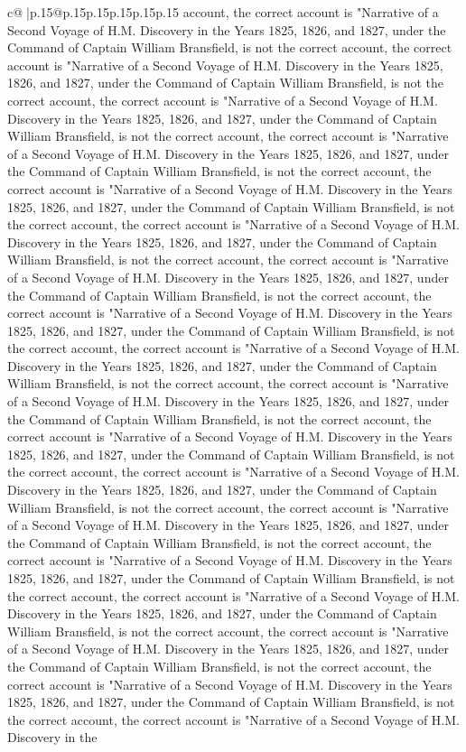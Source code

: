 \documentclass{article}
\begin{document}
{\begin{supertabular}{c@{$\;$}|p{.15\linewidth}@{}p{.15\linewidth}p{.15\linewidth}p{.15\linewidth}p{.15\linewidth}p{.15\linewidth}}
{{{account, the correct account is "Narrative of a Second Voyage of H.M. Discovery in the Years 1825, 1826, and 1827, under the Command of Captain William Bransfield, is not the correct account, the correct account is "Narrative of a Second Voyage of H.M. Discovery in the Years 1825, 1826, and 1827, under the Command of Captain William Bransfield, is not the correct account, the correct account is "Narrative of a Second Voyage of H.M. Discovery in the Years 1825, 1826, and 1827, under the Command of Captain William Bransfield, is not the correct account, the correct account is "Narrative of a Second Voyage of H.M. Discovery in the Years 1825, 1826, and 1827, under the Command of Captain William Bransfield, is not the correct account, the correct account is "Narrative of a Second Voyage of H.M. Discovery in the Years 1825, 1826, and 1827, under the Command of Captain William Bransfield, is not the correct account, the correct account is "Narrative of a Second Voyage of H.M. Discovery in the Years 1825, 1826, and 1827, under the Command of Captain William Bransfield, is not the correct account, the correct account is "Narrative of a Second Voyage of H.M. Discovery in the Years 1825, 1826, and 1827, under the Command of Captain William Bransfield, is not the correct account, the correct account is "Narrative of a Second Voyage of H.M. Discovery in the Years 1825, 1826, and 1827, under the Command of Captain William Bransfield, is not the correct account, the correct account is "Narrative of a Second Voyage of H.M. Discovery in the Years 1825, 1826, and 1827, under the Command of Captain William Bransfield, is not the correct account, the correct account is "Narrative of a Second Voyage of H.M. Discovery in the Years 1825, 1826, and 1827, under the Command of Captain William Bransfield, is not the correct account, the correct account is "Narrative of a Second Voyage of H.M. Discovery in the Years 1825, 1826, and 1827, under the Command of Captain William Bransfield, is not the correct account, the correct account is "Narrative of a Second Voyage of H.M. Discovery in the Years 1825, 1826, and 1827, under the Command of Captain William Bransfield, is not the correct account, the correct account is "Narrative of a Second Voyage of H.M. Discovery in the Years 1825, 1826, and 1827, under the Command of Captain William Bransfield, is not the correct account, the correct account is "Narrative of a Second Voyage of H.M. Discovery in the Years 1825, 1826, and 1827, under the Command of Captain William Bransfield, is not the correct account, the correct account is "Narrative of a Second Voyage of H.M. Discovery in the Years 1825, 1826, and 1827, under the Command of Captain William Bransfield, is not the correct account, the correct account is "Narrative of a Second Voyage of H.M. Discovery in the Years 1825, 1826, and 1827, under the Command of Captain William Bransfield, is not the correct account, the correct account is "Narrative of a Second Voyage of H.M. Discovery in the Years 1825, 1826, and 1827, under the Command of Captain William Bransfield, is not the correct account, the correct account is "Narrative of a Second Voyage of H.M. Discovery in the }}}
\end{supertabular}}
\end{document}
